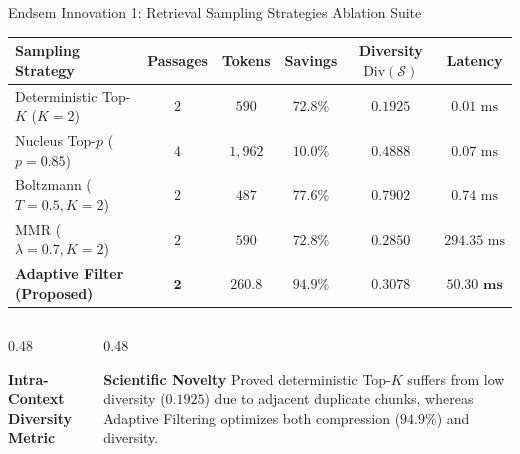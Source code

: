 \documentclass[10pt,aspectratio=169]{beamer}
\begin{document}
\begin{frame}{Endsem Innovation 1: Retrieval Sampling Strategies Ablation Suite}
    \begin{center}
    \scriptsize
    \begin{tabular}{lccccc}
    \toprule
    \textbf{Sampling Strategy} & \textbf{Passages} & \textbf{Tokens} & \textbf{Savings} & \textbf{Diversity $\text{Div}(\mathcal{S})$} & \textbf{Latency} \\
    \midrule
    Deterministic Top-$K$ ($K=2$) & $2$ & $590$ & $72.8\%$ & $0.1925$ & $0.01\text{ ms}$ \\
    Nucleus Top-$p$ ($p=0.85$) & $4$ & $1,962$ & $10.0\%$ & $0.4888$ & $0.07\text{ ms}$ \\
    Boltzmann ($T=0.5, K=2$) & $2$ & $487$ & $77.6\%$ & $0.7902$ & $0.74\text{ ms}$ \\
    MMR ($\lambda=0.7, K=2$) & $2$ & $590$ & $72.8\%$ & $0.2850$ & $294.35\text{ ms}$ \\
    \textbf{Adaptive Filter (Proposed)} & $\mathbf{2}$ & $\mathbf{260.8}$ & $\mathbf{94.9\%}$ & $\mathbf{0.3078}$ & $\mathbf{50.30\text{ ms}}$ \\
    \bottomrule
    \end{tabular}
    \end{center}

    \vspace{0.1cm}
    \begin{columns}[onlytextwidth,T]
        \begin{column}{0.48\textwidth}
            \begin{block}{\textbf{Intra-Context Diversity Metric}}
                \centering
                \vspace{2pt}
                \vspace{2pt}
            \end{block}
        \end{column}
        \begin{column}{0.48\textwidth}
            \begin{alertblock}{\textbf{Scientific Novelty}}
                \footnotesize
                Proved deterministic Top-$K$ suffers from low diversity ($0.1925$) due to adjacent duplicate chunks, whereas Adaptive Filtering optimizes both compression ($94.9\%$) and diversity.
            \end{alertblock}
        \end{column}
    \end{columns}
\end{frame}
\end{document}
